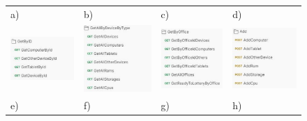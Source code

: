 \begin{figure}[htb]
  \centering
	\begin{tabular}{@{}llll@{}}
	a) & b) & c) & d) \\
	\includegraphics[width=0.21\linewidth]{rys06/struct/byid.pdf} & 
	\includegraphics[width=0.21\linewidth]{rys06/struct/alldevices.pdf} & 
	\includegraphics[width=0.21\linewidth]{rys06/struct/byOffice.pdf} & 
	\includegraphics[width=0.21\linewidth]{rys06/struct/add.pdf} \\
 
	e) & f) & g) & h)\\
	

\end{tabular}
\end{figure}
